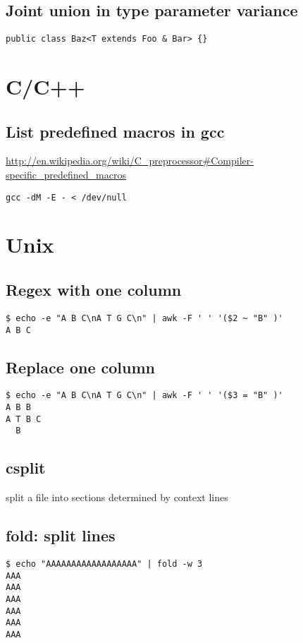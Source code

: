 \documentclass[12pt]{article}
\begin{document}
\subsection{Joint union in type parameter variance}
\begin{verbatim}
public class Baz<T extends Foo & Bar> {}
\end{verbatim}
\section{C/C++}
\subsection{List predefined macros in gcc}
\url{http://en.wikipedia.org/wiki/C_preprocessor#Compiler-specific_predefined_macros}
\begin{verbatim}
gcc -dM -E - < /dev/null
\end{verbatim}

\section{Unix}
\subsection{Regex with one column}
\begin{verbatim}
$ echo -e "A B C\nA T G C\n" | awk -F ' ' '($2 ~ "B" )'
A B C
\end{verbatim}
\subsection{Replace one column}
\begin{verbatim}
$ echo -e "A B C\nA T G C\n" | awk -F ' ' '($3 = "B" )'
A B B
A T B C
  B

\end{verbatim}
\subsection{csplit }
split a file into sections determined by context lines
\subsection{fold: split lines}
\begin{verbatim}
$ echo "AAAAAAAAAAAAAAAAAA" | fold -w 3
AAA
AAA
AAA
AAA
AAA
AAA
\end{verbatim}
\end{document}
